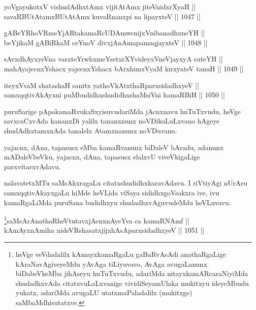 \begin{shl}
yoVgayukotxV vishudAdhxtAmx vijitAtAmx jiteVnidxrXyaH || \\
savaRBUtAtamxBUtAtAmx kuvaRnanxpi na lipayxteV \hfill || 1047 ||  
\end{shl}
				
\begin{shl}
gABeYRhoVRmeYjARtakamaRcUDAmwcnijxVnibanadhxneYH || \\
beYjikaM gABiRkaM ceYnoV divxjAnAmapamaqjayxteV \hfill || 1048 ||  
\end{shl}
				
\begin{shl}
sAvxdhAyxyeVna varxteYrwhxmeYsetxrXYvideyxVneVjayxyA suteYH || \\
mahAyajecnxYshacx yajecnxYshacx bArxhimxVyaM kirxyateV tanuH \hfill || 1049 ||  
\end{shl}
				
\begin{shl}
iteyxVvaM shatashaH sanitx yathoVkAtxthaRparxsidadhxyeV ||  \\
samxqqtivAkAyxni puMbudidhxshudidhxshaMsiVni kamaRBiH \hfill || 1050 ||  
\end{shl}

\begin{artha}
puruSarige pApakamaRvukaSxyisuvudariMda jAcnxnavu huTuTxvudu, heVge savxcaCxvAda kananxDi yalilx tananxnunx noVDikoLuLxvano hAgeye shudAdhxtamxnAda  tanalelx Atamxnanunx noVDuvanu.
\end{artha}

\begin{artha}
yajacnx, dAna, tapasusx eMba kamaRvanunx biDaleV bAradu, adanunx mADaleVbeVku, yajacnx, dAna, tapasusx elalxvU viveVkigaLige parxvitarxvAdavu.
\end{artha}

\begin{artha}
nalavatetxMTu saMsAkxragaLu citatxshudidhxkaravAdavu. I riVtiyAgi nUrAru samxqqtivAkayxgaLu hiMde heVLida viSaya sididhxgoVsakxra ive, ivu kamaRgaLiMda puruSana budidhxyu shudadhxvAguvudeMdu heVLuvavu.
\end{artha}



\begin{shl}
\footnote{heVge veVdadalilx kAmayxkamaRgaLu gaBaRvAsAdi anathaRgaLige kAraNavAgiveyeMdu yAvAga tiLiyuvavo, AvAga avugaLanunx biDabeVkeMba jihAseyu huTuTxvudu, adariMda nitayxkamARcaraNiyiMda shudadhxvAda citatxvuLaLxvanige vividiSeyamUlaka mukitxyu ideyeMbudu yukatx, adariMda avugaLU utatxmaPaladalilx (mukitxge) saMbaMdhisutatxve.}saMsArAnathaRheVtutavxjAcnxnAyeYva ca kamaRNAmf || \\
kAmAyxnAmiha nideVRshasatxjijxhAsAparxsidadhxyeV \hfill || 1051 ||  
\end{shl}

